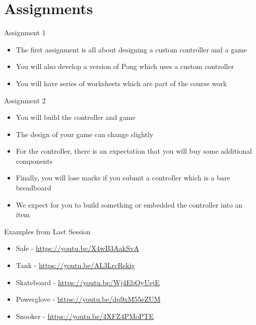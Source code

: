 \part{Assignments}
\frame{\partpage}

\begin{frame}{Assignment 1}
\begin{itemize}
	\pause \item The first assignment is all about designing a custom controller and a game
	\pause \item You will also develop a version of Pong which uses a custom controller
	\pause \item You will have series of worksheets which are part of the course work
\end{itemize}
\end{frame}


\begin{frame}{Assignment 2}
\begin{itemize}
	\pause \item You will build the controller and game
	\pause \item The design of your game can change slightly
	\pause \item For the controller, there is an expectation that you will buy some additional components
	\pause \item Finally, you will lose marks if you submit a controller which is a bare breadboard
	\pause \item We expect for you to build something or embedded the controller into an item
\end{itemize}
\end{frame}

\begin{frame}{Examples from Last Session}
\begin{itemize}
	\item Safe - \url{https://youtu.be/X4wB3AakSvA}
	\item Tank - \url{https://youtu.be/AL3LrcRskig}
	\item Skateboard - \url{https://youtu.be/Wj4EbOyUejE}
	\item Powerglove - \url{https://youtu.be/dp9xM55eZUM}
	\item Snooker -  \url{https://youtu.be/4XFZ4PMoPTE}
\end{itemize}
\end{frame}